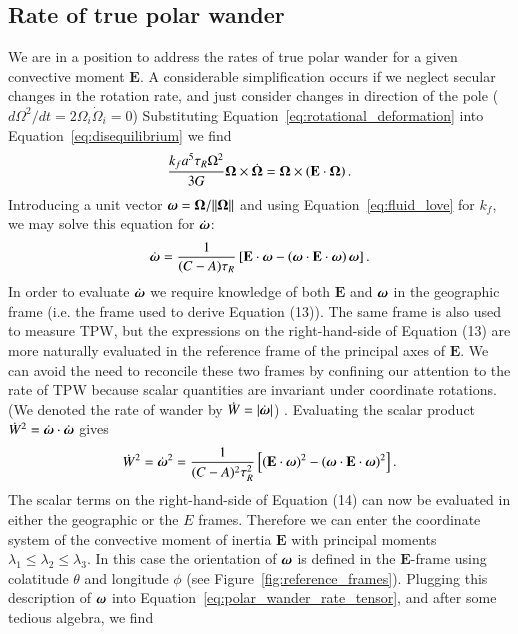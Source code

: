 \documentclass[preprint,12pt,authoryear]{elsarticle}
\newcommand{\mitbf}[1]{\hbox{\mathversion{bold}$#1$}}
\begin{document}
\subsection{Rate of true polar wander}
\label{sec:tpw_rate}

We are in a position to address the rates of true polar wander for a given convective moment $\mathbf{E}$.
A considerable simplification occurs if we neglect secular changes in the rotation rate, and just consider changes in direction of the pole ($d \Omega^2 / dt = 2 {\Omega_i} \dot{ \Omega}_i = 0$)
Substituting Equation~\eqref{eq:rotational_deformation} into Equation~\eqref{eq:disequilibrium} we find
\begin{equation}
\frac{k_f a^5 \tau_R \Omega^2}{3G}\mitbf{\Omega} \times \dot{\mitbf{\Omega} } = \mitbf{\Omega} \times \left( \mathbf{E} \cdot \mitbf{\Omega} \right).
\label{eq:liouville}
\end{equation}
Introducing a unit vector $\mitbf{\omega} = \mitbf{\Omega}/\|\mitbf{\Omega} \|$ and using Equation~\eqref{eq:fluid_love} for $k_f$,  we may solve this equation for $\dot{\mitbf{\omega}}$:
\begin{equation}
 \dot{\mitbf{\omega}}  = \frac{1}{(C-A)\tau_R} \left[ \mathbf{E} \cdot \mitbf{\omega} - \left( \mitbf{\omega} \cdot \mathbf{E} \cdot \mitbf{\omega}  \right) \mitbf{\omega} \right].
\label{eq:liouville_ode}
\end{equation}
In order to evaluate $\dot{\mitbf{\omega}}$ we require knowledge of both $\mathbf{E}$ and $\mitbf{\omega}$ in the geographic frame (i.e. the frame used to derive Equation (13)). The same frame is also used to measure TPW, but the expressions on the right-hand-side of Equation (13) are more naturally evaluated in the reference frame of the principal axes of $\mathbf{E}$.
We can avoid the need to reconcile these two frames by confining our attention to the rate of TPW because scalar quantities are invariant under coordinate rotations. (We denoted  the rate of wander by 
 $\dot{W} = \vert \dot{\mitbf{\omega}} \vert$) .
Evaluating the scalar product $\dot{W}^2 = \dot{\mitbf{\omega}} \cdot \dot{\mitbf{\omega}}$ gives
\begin{equation}
\dot{W}^2 = \dot{\mitbf{\omega}}^2 = \frac{1}{(C-A)^2 \tau_R^2} \left[ (\mathbf{E}\cdot\mitbf{\omega})^2 - (\mitbf{\omega}\cdot\mathbf{E}\cdot\mitbf{\omega})^2 \right].
\label{eq:polar_wander_rate_tensor}
\end{equation}
The scalar terms on the right-hand-side of Equation (14) can now be evaluated in either the geographic or the $E$ frames.
Therefore we can enter the coordinate system of the convective moment of inertia $\mathbf{E}$ 
with principal moments $\lambda_1 \le \lambda_2 \le \lambda_3$. In this case the orientation of 
$\mitbf{\omega}$ is defined in the $\mathbf{E}$-frame using colatitude $\theta$ and longitude $\phi$ (see Figure~\ref{fig:reference_frames}).
Plugging this description of $\mitbf{\omega}$ into Equation~\eqref{eq:polar_wander_rate_tensor},
and after some tedious algebra, we find
\end{document}
